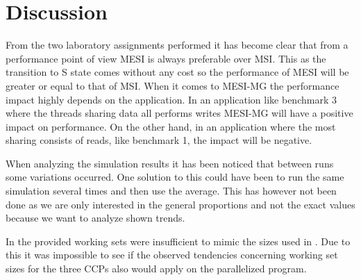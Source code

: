 \section{Discussion}
\label{sec:dis}
From the two laboratory assignments performed it has become clear that from a performance point of view MESI is always preferable over MSI. This as the transition to S state comes without any cost so the performance of MESI will be greater or equal to that of MSI. When it comes to MESI-MG the performance impact highly depends on the application. In an application like benchmark 3 where the threads sharing data all performs writes MESI-MG will have a positive impact on performance. On the other hand, in an application where the most sharing consists of reads, like benchmark 1, the impact will be negative.

When analyzing the simulation results it has been noticed that between runs some variations occurred. One solution to this could have been to run the same simulation several times and then use the average. This has however not been done as we are only interested in the general proportions and not the exact values because we want to analyze shown trends.

In  the provided working sets were insufficient to mimic the sizes used in . Due to this it was impossible to see if the observed tendencies concerning working set sizes for the three CCPs also would apply on the parallelized program.